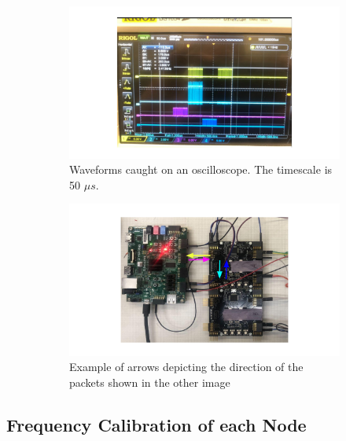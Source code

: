 \begin{figure}
\centering
\begin{subfigure}{.5\textwidth}
  \centering
  \includegraphics[width=\textwidth]{images/qdb_example_packet_waveform.pdf}
  \caption{Waveforms caught on an oscilloscope. The timescale is 50 $\unit{\mu s}$.}
\end{subfigure}%
\begin{subfigure}{.5\textwidth}
  \centering
  \includegraphics[width=\textwidth]{images/qdb_example_packet_waveform_diagram.pdf}
  \caption{Example of arrows depicting the direction of the packets shown in the other image}
\end{subfigure}
\caption{}
\end{figure}



\subsection{Frequency Calibration of each Node}




